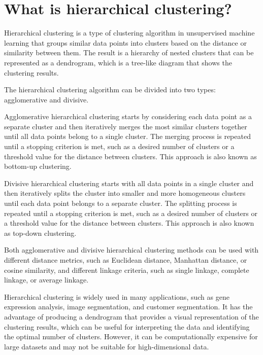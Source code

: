 \section{What is hierarchical clustering?}
Hierarchical clustering is a type of clustering algorithm in unsupervised machine learning that groups similar data points into clusters based on the distance or similarity between them. The result is a hierarchy of nested clusters that can be represented as a dendrogram, which is a tree-like diagram that shows the clustering results.

The hierarchical clustering algorithm can be divided into two types: agglomerative and divisive.

Agglomerative hierarchical clustering starts by considering each data point as a separate cluster and then iteratively merges the most similar clusters together until all data points belong to a single cluster. The merging process is repeated until a stopping criterion is met, such as a desired number of clusters or a threshold value for the distance between clusters. This approach is also known as bottom-up clustering.

Divisive hierarchical clustering starts with all data points in a single cluster and then iteratively splits the cluster into smaller and more homogeneous clusters until each data point belongs to a separate cluster. The splitting process is repeated until a stopping criterion is met, such as a desired number of clusters or a threshold value for the distance between clusters. This approach is also known as top-down clustering.

Both agglomerative and divisive hierarchical clustering methods can be used with different distance metrics, such as Euclidean distance, Manhattan distance, or cosine similarity, and different linkage criteria, such as single linkage, complete linkage, or average linkage.

Hierarchical clustering is widely used in many applications, such as gene expression analysis, image segmentation, and customer segmentation. It has the advantage of producing a dendrogram that provides a visual representation of the clustering results, which can be useful for interpreting the data and identifying the optimal number of clusters. However, it can be computationally expensive for large datasets and may not be suitable for high-dimensional data.

